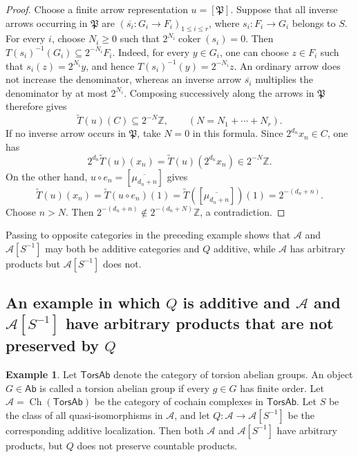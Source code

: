 \documentclass[10pt,a4paper]{amsart}
\theoremstyle{plain}
\theoremstyle{definition}
\newtheorem{example}[theorem]{Example}
\theoremstyle{remark}
\begin{document}
\begin{proof}
  Choose a finite arrow representation $u=[\mathfrak P]$.
  Suppose that all inverse arrows occurring in $\mathfrak P$ are $(\overline{s_i}:G_i\longrightarrow F_i)_{1 \leq i \leq r}$, where $s_i:F_i\longrightarrow G_i$ belongs to $S$.
  For every $i$, choose $N_i\geq0$ such that $2^{N_i}\operatorname{coker}(s_i)=0$.
  Then $T(s_i)^{-1}(G_i)\subseteq2^{-N_i}F_i$.
  Indeed, for every $y\in G_i$, one can choose $z\in F_i$ such that $s_i(z)=2^{N_i}y$, and hence $T(s_i)^{-1}(y)=2^{-N_i}z$.
  An ordinary arrow does not increase the denominator, whereas an inverse arrow $\overline{s_i}$ multiplies the denominator by at most $2^{N_i}$.
  Composing successively along the arrows in $\mathfrak P$ therefore gives
  \[
    \widetilde T(u)(C)\subseteq2^{-N}\mathbb Z , \qquad (N =N_1+\cdots+N_r).
  \]
  If no inverse arrow occurs in $\mathfrak P$, take $N=0$ in this formula.
  Since $2^{d_n}x_n\in C$, one has
  \[
    2^{d_n}\widetilde T(u)(x_n)
    =\widetilde T(u)(2^{d_n}x_n)
    \in2^{-N}\mathbb Z.
  \]
  On the other hand, $u\circ e_n=[\overline{\mu_{d_n+n}}]$ gives
  \[
    \widetilde T(u)(x_n)
    =\widetilde T(u\circ e_n)(1)
    =\widetilde T([\overline{\mu_{d_n+n}}])(1)
    =2^{-(d_n+n)}.
  \]
  Choose $n>N$.
  Then $2^{-(d_n+n)}\notin2^{-(d_n+N)}\mathbb Z$, a contradiction.
\end{proof}

Passing to opposite categories in the preceding example shows that $\mathcal{A}$ and $\mathcal{A}[S^{-1}]$ may both be additive categories and $Q$ additive, while $\mathcal{A}$ has arbitrary products but $\mathcal{A}[S^{-1}]$ does not.

\subsection{\texorpdfstring{An example in which $Q$ is additive and $\mathcal{A}$ and $\mathcal{A}[S^{-1}]$ have arbitrary products that are not preserved by $Q$}{An example in which Q is additive and A and its localization have arbitrary products that are not preserved by Q}}

\begin{example}\label{ex:torsion-complexes}
  Let $\mathsf{TorsAb}$ denote the category of torsion abelian groups.
  An object $G \in \mathsf{Ab}$ is called a torsion abelian group if every $g \in G$ has finite order.
  Let $\mathcal A=\operatorname{Ch}(\mathsf{TorsAb})$ be the category of cochain complexes in $\mathsf{TorsAb}$.
  Let $S$ be the class of all quasi-isomorphisms in $\mathcal{A}$, and let $Q:\mathcal A\longrightarrow\mathcal A[S^{-1}]$ be the corresponding additive localization.
  Then both $\mathcal A$ and $\mathcal A[S^{-1}]$ have arbitrary products, but $Q$ does not preserve countable products.
\end{example}
\end{document}
